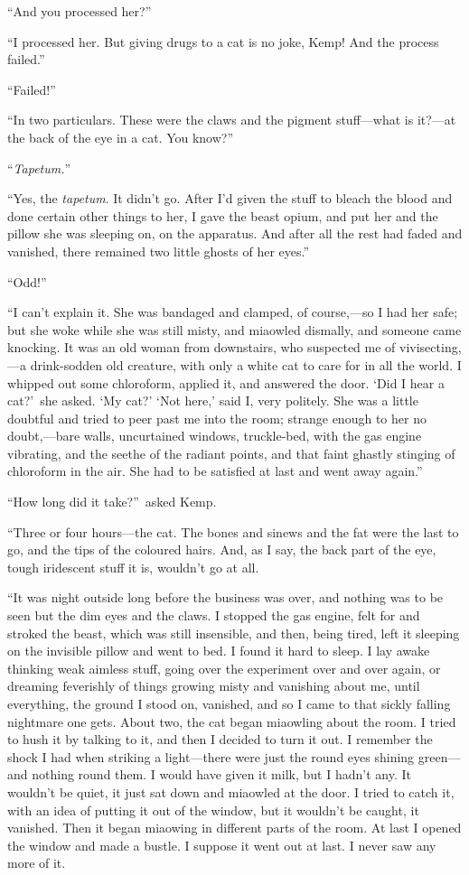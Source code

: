 “And you processed her?”

“I processed her. But giving drugs to a cat is no joke, Kemp! And the process failed.”

“Failed!”

“In two particulars. These were the claws and the pigment stuff—what is it?—at the back of the eye in a cat. You know?”

“\emph{Tapetum.}”

“Yes, the \emph{tapetum}. It didn’t go. After I’d given the stuff to bleach the blood and done certain other things to her, I gave the beast opium, and put her and the pillow she was sleeping on, on the apparatus. And after all the rest had faded and vanished, there remained two little ghosts of her eyes.”

“Odd!”

“I can’t explain it. She was bandaged and clamped, of course,—so I had her safe; but she woke while she was still misty, and miaowled dismally, and someone came knocking. It was an old woman from downstairs, who suspected me of vivisecting,—a drink-sodden old creature, with only a white cat to care for in all the world. I whipped out some chloroform, applied it, and answered the door. ‘Did I hear a cat?’\ she asked. ‘My cat?’ ‘Not here,’ said I, very politely. She was a little doubtful and tried to peer past me into the room; strange enough to her no doubt,—bare walls, uncurtained windows, truckle-bed, with the gas engine vibrating, and the seethe of the radiant points, and that faint ghastly stinging of chloroform in the air. She had to be satisfied at last and went away again.”

“How long did it take?”\ asked Kemp.

“Three or four hours—the cat. The bones and sinews and the fat were the last to go, and the tips of the coloured hairs. And, as I say, the back part of the eye, tough iridescent stuff it is, wouldn’t go at all.

“It was night outside long before the business was over, and nothing was to be seen but the dim eyes and the claws. I stopped the gas engine, felt for and stroked the beast, which was still insensible, and then, being tired, left it sleeping on the invisible pillow and went to bed. I found it hard to sleep. I lay awake thinking weak aimless stuff, going over the experiment over and over again, or dreaming feverishly of things growing misty and vanishing about me, until everything, the ground I stood on, vanished, and so I came to that sickly falling nightmare one gets. About two, the cat began miaowling about the room. I tried to hush it by talking to it, and then I decided to turn it out. I remember the shock I had when striking a light—there were just the round eyes shining green—and nothing round them. I would have given it milk, but I hadn’t any. It wouldn’t be quiet, it just sat down and miaowled at the door. I tried to catch it, with an idea of putting it out of the window, but it wouldn’t be caught, it vanished. Then it began miaowing in different parts of the room. At last I opened the window and made a bustle. I suppose it went out at last. I never saw any more of it.

